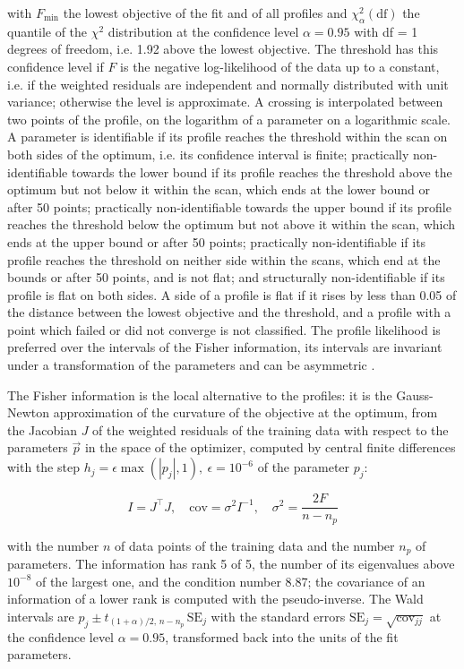 with $F_{\min}$ the lowest objective of the fit and of all profiles and $\chi^2_{\alpha}(\mathrm{df})$ the quantile of the $\chi^2$ distribution at the confidence level $\alpha = 0.95$ with df = 1 degrees of freedom, i.e. 1.92 above the lowest objective. The threshold has this confidence level if $F$ is the negative log-likelihood of the data up to a constant, i.e. if the weighted residuals are independent and normally distributed with unit variance; otherwise the level is approximate. A crossing is interpolated between two points of the profile, on the logarithm of a parameter on a logarithmic scale. A parameter is identifiable if its profile reaches the threshold within the scan on both sides of the optimum, i.e. its confidence interval is finite; practically non-identifiable towards the lower bound if its profile reaches the threshold above the optimum but not below it within the scan, which ends at the lower bound or after 50 points; practically non-identifiable towards the upper bound if its profile reaches the threshold below the optimum but not above it within the scan, which ends at the upper bound or after 50 points; practically non-identifiable if its profile reaches the threshold on neither side within the scans, which end at the bounds or after 50 points, and is not flat; and structurally non-identifiable if its profile is flat on both sides. A side of a profile is flat if it rises by less than 0.05 of the distance between the lowest objective and the threshold, and a profile with a point which failed or did not converge is not classified. The profile likelihood is preferred over the intervals of the Fisher information, its intervals are invariant under a transformation of the parameters and can be asymmetric \cite{Wieland2021}.

The Fisher information is the local alternative to the profiles: it is the Gauss-Newton approximation of the curvature of the objective at the optimum, from the Jacobian $J$ of the weighted residuals of the training data with respect to the parameters $\vec{p}$ in the space of the optimizer, computed by central finite differences with the step $h_j = \epsilon \max(|p_j|, 1),\ \epsilon = 10^{-6}$ of the parameter $p_j$:

\begin{equation}
I = J^\top J, \quad \mathrm{cov} = \sigma^2 I^{-1}, \quad \sigma^2 = \frac{2 F}{n - n_p}
\end{equation}

with the number $n$ of data points of the training data and the number $n_p$ of parameters. The information has rank 5 of 5, the number of its eigenvalues above $10^{-8}$ of the largest one, and the condition number 8.87; the covariance of an information of a lower rank is computed with the pseudo-inverse. The Wald intervals are $\hat{p}_j \pm t_{(1+\alpha)/2,\, n-n_p}\, \mathrm{SE}_j$ with the standard errors $\mathrm{SE}_j = \sqrt{\mathrm{cov}_{jj}}$ at the confidence level $\alpha = 0.95$, transformed back into the units of the fit parameters.


